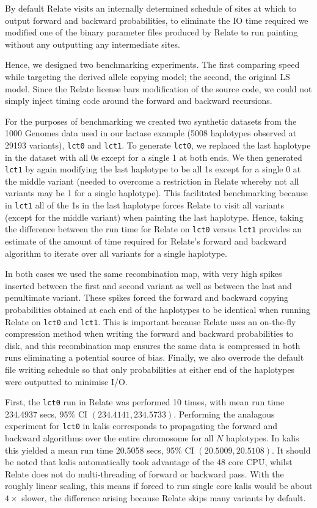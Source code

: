 \documentclass[a4paper]{article}
\newcommand{\pkg}[1]{{\fontseries{m}\fontseries{b}\selectfont #1}}
\begin{document}
By default Relate visits an internally determined schedule of sites at which to output forward and backward probabilities, to eliminate the IO time required we modified one of the binary parameter files produced by Relate to run painting without any outputting any intermediate sites.

Hence, we designed two benchmarking experiments.
The first comparing speed while targeting the derived allele copying model; the second, the original LS model.
Since the Relate license bars modification of the source code, we could not simply inject timing code around the forward and backward recursions.

For the purposes of benchmarking we created two synthetic datasets from the 1000 Genomes data used in our lactase example (5008 haplotypes observed at 29193 variants), \texttt{lct0} and \texttt{lct1}.
To generate \texttt{lct0}, we replaced the last haplotype in the dataset with all 0s except for a single 1 at both ends.
We then generated \texttt{lct1} by again modifying the last haplotype to be all 1s except for a single 0 at the middle variant (needed to overcome a restriction in Relate whereby not all variants may be 1 for a single haplotype).
This facilitated benchmarking because in \texttt{lct1} all of the 1s in the last haplotype forces Relate to visit all variants (except for the middle variant) when painting the last haplotype.
Hence, taking the difference between the run time for Relate on \texttt{lct0} versus \texttt{lct1} provides an estimate of the amount of time required for Relate's forward and backward algorithm to iterate over all variants for a single haplotype.

In both cases we used the same recombination map, with very high spikes inserted between the first and second variant as well as between the last and penultimate variant.
These spikes forced the forward and backward copying probabilities obtained at each end of the haplotypes to be identical when running Relate on \texttt{lct0} and \texttt{lct1}.
This is important because Relate uses an on-the-fly compression method when writing the forward and backward probabilities to disk, and this recombination map ensures the same data is compressed in both runs eliminating a potential source of bias.
Finally, we also overrode the default file writing schedule so that only probabilities at either end of the haplotypes were outputted to minimise I/O.

First, the \texttt{lct0} run in Relate was performed 10 times, with mean run time 234.4937 secs, 95\% CI $(234.4141, 234.5733)$.
Performing the analagous experiment for \texttt{lct0} in \pkg{kalis} corresponds to propagating the forward and backward algorithms over the entire chromosome for all $N$ haplotypes.
In \pkg{kalis} this yielded a mean run time 20.5058 secs, 95\% CI $(20.5009, 20.5108)$.
It should be noted that \pkg{kalis} automatically took advantage of the 48 core CPU, whilst Relate does not do multi-threading of forward or backward pass.
With the roughly linear scaling, this means if forced to run single core \pkg{kalis} would be about $4\times$ slower, the difference arising because Relate skips many variants by default.
\end{document}
